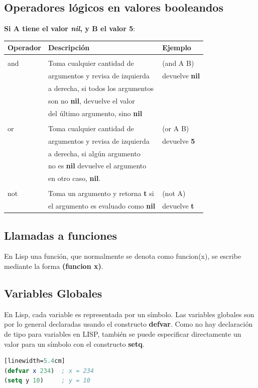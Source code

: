 \documentclass[10pt,journal,compsoc]{IEEEtran}
\begin{document}
\subsection{Operadores l\'ogicos en valores booleandos}
\textbf{Si A tiene el valor \emph{nil}, y B el valor 5}:
\begin{tabular}{ l | l | l}
	\hline
	Operador & Descripci\'on & Ejemplo\\ 
	\hline\\
	and & Toma cualquier cantidad de &  (and A B)\\&argumentos y revisa de izquierda & devuelve \textbf{nil}\\ & a derecha, si todos los argumentos \\ &son no \textbf{nil}, devuelve el valor \\ & del \'ultimo argumento, sino \textbf{nil} \\
	\hline\\
	or & Toma cualquier cantidad de & (or A B) \\ &argumentos y revisa de izquierda & devuelve \textbf{5} \\& a derecha, si alg\'un argumento \\ & no es \textbf{nil} devuelve el argumento\\ & en otro caso, \textbf{nil}.\\
	\hline\\
	not & Toma un argumento y retorna \textbf{t} si& (not A)\\ &el argumento es evaluado como \textbf{nil} &devuelve \textbf{t}\\
\end{tabular}

\subsection{Llamadas a funciones}
En Lisp una funci\'on, que normalmente se denota como funcion(x), se escribe mediante la forma \textbf{(funcion x)}.

\subsection{Variables Globales}
En Lisp, cada variable es representada por un s\'imbolo. Las variables globales son por lo general declaradas usando el constructo \textbf{defvar}. Como no hay declaraci\'on de tipo para variables en LISP, tambi\'en se puede especificar directamente un valor para un s\'imbolo con el constructo \textbf{setq}.
\begin{lstlisting}[language=Lisp, caption = {Declaraci\'on de variables globales}][linewidth=5.4cm]
(defvar x 234)  ; x = 234
(setq y 10)   	; y = 10
\end{lstlisting}
\end{document}
